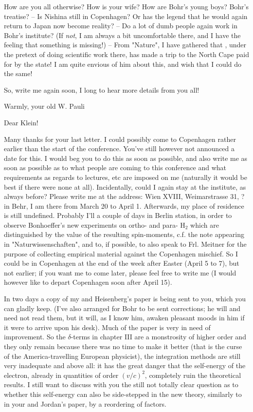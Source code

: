 \documentclass{article}
\begin{document}
How are you all otherwise? How is your wife? How are Bohr's young boys?  Bohr's treatise? -- Is Nishina still in Copenhagen? Or has the legend that he would again return to Japan now become reality? -- Do a lot of dumb people again work in Bohr's institute? (If \textit{not}, I am always a bit uncomfortable there, and I have the feeling that something is missing!) -- From "Nature", I have gathered that , under the pretext of doing scientific work there, has made a trip to the North Cape paid for by the state! I am quite envious of him about this, and wish that I could do the same!

So, write me again soon, I long to hear more details from you all!

Warmly, your old
W. Pauli

\date{March 16, 1929}

Dear Klein!

Many thanks for your last letter. I could possibly come to Copenhagen rather earlier than the start of the conference. You've still however not announced a date for this. I would beg you to do this as soon as possible, and also write me as soon as possible as to what people are coming to this conference and what requirements as regards to lectures, etc are imposed on me (naturally it would be best if there were none at all). Incidentally, could I again stay at the institute, as always before? Please write me at the address: Wien XVIII, Weimarstrasse 31, ?{in Behr}, I am there from March 20 to April 1. Afterwards, my place of residence is still undefined. Probably I'll  a couple of days in Berlin station, in order to observe Bonhoeffer's new experiments on ortho- and para- $\text{H}_2$ 
which are distinguished by the value of the resulting spin-moments, c.f. the note appearing in "Naturwissenschaften", and to, if possible, to also speak to Frl. Meitner for the purpose of collecting empirical material against the Copenhagen mischief. So I could be in Copenhagen at the end of the week after Easter (April 5 to 7), but not earlier; if you want me to come later, please feel free to write me (I would however like to depart Copenhagen soon after April 15).

In two days a copy of my and Heisenberg's paper is being sent to you, which you can gladly keep. (I've also arranged for Bohr to be sent corrections; he will and need not read them, but it will, as I know him, awaken pleasant moods in him if it were to arrive upon his desk). Much of the paper is very in need of improvement. So the $\delta$-terms in chapter III are a monstrosity of higher order and they only remain because there was no time to make it better (that is the curse of the America-travelling European physicist), the integration methods are still very inadequate and above all: it has the great danger that the self-energy of the electron, already in quantities of order $(v/c)^2$, completely ruin the theoretical results. I still want to discuss with you the still not totally clear question as to whether this self-energy can also be side-stepped in the new theory, similarly to in your and Jordan's paper, by a reordering of factors.
\end{document}
